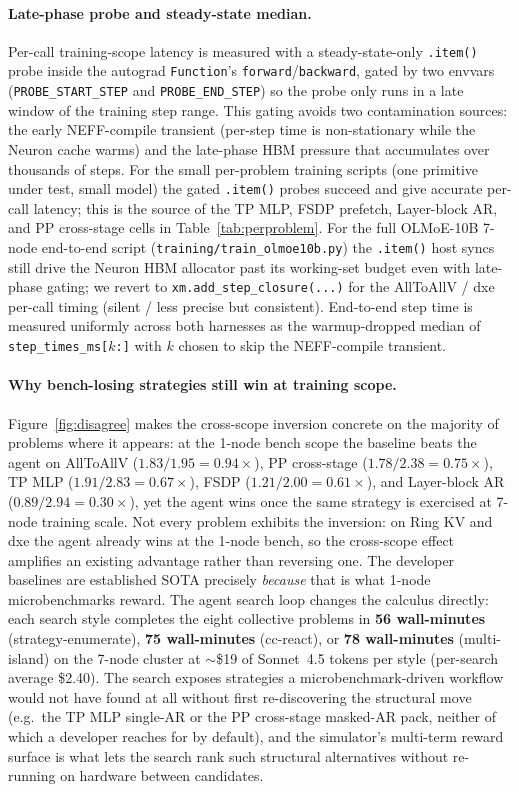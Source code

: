\paragraph{Late-phase probe and steady-state median.}
Per-call training-scope latency is measured with a steady-state-only \texttt{.item()} probe
inside the autograd \texttt{Function}'s
\texttt{forward}/\texttt{backward}, gated by two envvars
(\texttt{PROBE\_START\_STEP} and \texttt{PROBE\_END\_STEP}) so the
probe only runs in a late window of the training step range. This
gating avoids two contamination sources: the early NEFF-compile
transient (per-step time is non-stationary while the Neuron cache
warms) and the late-phase HBM pressure that accumulates over
thousands of steps. For the small per-problem training scripts
(one primitive under test, small model) the gated \texttt{.item()}
probes succeed and give accurate per-call latency; this is the
source of the TP MLP, FSDP prefetch, Layer-block AR, and
PP cross-stage cells in Table~\ref{tab:perproblem}. For the full
OLMoE-10B 7-node end-to-end script
(\texttt{training/train\_olmoe10b.py}) the \texttt{.item()} host
syncs still drive the Neuron HBM allocator past its working-set
budget even with late-phase gating; we revert to
\texttt{xm.add\_step\_closure(...)} for the AllToAllV / dxe
per-call timing (silent / less precise but consistent). End-to-end step time is measured uniformly across both
harnesses as the warmup-dropped median of
\texttt{step\_times\_ms[$k$:]} with $k$ chosen to skip the
NEFF-compile transient.


\paragraph{Why bench-losing strategies still win at training scope.}
Figure~\ref{fig:disagree} makes the cross-scope inversion
concrete on the majority of problems where it appears: at the
1-node bench scope the baseline beats the agent on AllToAllV
($1.83/1.95{=}0.94\times$), PP cross-stage
($1.78/2.38{=}0.75\times$), TP MLP ($1.91/2.83{=}0.67\times$),
FSDP ($1.21/2.00{=}0.61\times$), and Layer-block AR
($0.89/2.94{=}0.30\times$), yet the agent wins once the same
strategy is exercised at 7-node training scale. Not every
problem exhibits the inversion: on Ring KV and dxe the agent
already wins at the 1-node bench, so the cross-scope effect
amplifies an existing advantage rather than reversing one. The developer baselines are
established SOTA precisely \emph{because} that is what 1-node
microbenchmarks reward. The agent search loop changes the calculus
directly: each search style completes the eight collective problems
in \textbf{56 wall-minutes} (strategy-enumerate),
\textbf{75 wall-minutes} (cc-react), or \textbf{78 wall-minutes}
(multi-island) on the 7-node cluster at $\sim$\$19 of Sonnet~4.5
tokens per style (per-search average \$2.40). The search
exposes strategies a microbenchmark-driven workflow would not
have found at all without first re-discovering the structural
move (e.g.\ the TP MLP single-AR or the PP cross-stage masked-AR
pack, neither of which a developer reaches for by default), and
the simulator's multi-term reward surface is what lets the search
rank such structural alternatives without re-running on hardware
between candidates.


